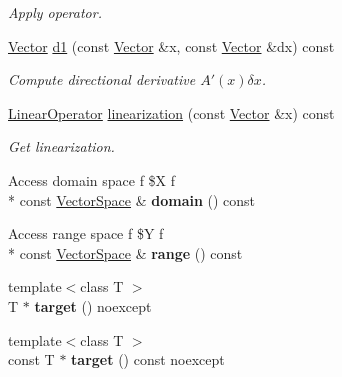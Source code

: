 \begin{DoxyCompactItemize}
\begin{DoxyCompactList}\small\item\em Apply operator. \end{DoxyCompactList}\item 
\hypertarget{classSpacy_1_1C1Operator_a1b6a06c88bc4168c750ee4ffdc81f1dd}{\hyperlink{classSpacy_1_1Vector}{Vector} \hyperlink{classSpacy_1_1C1Operator_a1b6a06c88bc4168c750ee4ffdc81f1dd}{d1} (const \hyperlink{classSpacy_1_1Vector}{Vector} \&x, const \hyperlink{classSpacy_1_1Vector}{Vector} \&dx) const }\label{classSpacy_1_1C1Operator_a1b6a06c88bc4168c750ee4ffdc81f1dd}

\begin{DoxyCompactList}\small\item\em Compute directional derivative $A'(x)\delta x$. \end{DoxyCompactList}\item 
\hypertarget{classSpacy_1_1C1Operator_a71aabe09ec29a8a1bb197eef035d6672}{\hyperlink{classSpacy_1_1LinearOperator}{Linear\-Operator} \hyperlink{classSpacy_1_1C1Operator_a71aabe09ec29a8a1bb197eef035d6672}{linearization} (const \hyperlink{classSpacy_1_1Vector}{Vector} \&x) const }\label{classSpacy_1_1C1Operator_a71aabe09ec29a8a1bb197eef035d6672}

\begin{DoxyCompactList}\small\item\em Get linearization. \end{DoxyCompactList}\item 
\hypertarget{classSpacy_1_1C1Operator_a0ce49bb91eee9fa9cc5d63599ab9b23c}{Access domain space f \$X f \\*
const \hyperlink{classSpacy_1_1VectorSpace}{Vector\-Space} \& {\bfseries domain} () const }\label{classSpacy_1_1C1Operator_a0ce49bb91eee9fa9cc5d63599ab9b23c}

\item 
\hypertarget{classSpacy_1_1C1Operator_a1331de78c1c489b846507c3f7461dc15}{Access range space f \$Y f \\*
const \hyperlink{classSpacy_1_1VectorSpace}{Vector\-Space} \& {\bfseries range} () const }\label{classSpacy_1_1C1Operator_a1331de78c1c489b846507c3f7461dc15}

\item 
\hypertarget{classSpacy_1_1C1Operator_a7c515af344029cf8e60e89d45bf8fade}{{\footnotesize template$<$class T $>$ }\\T $\ast$ {\bfseries target} () noexcept}\label{classSpacy_1_1C1Operator_a7c515af344029cf8e60e89d45bf8fade}

\item 
\hypertarget{classSpacy_1_1C1Operator_ab8a5618949b1b861e3085aa085922884}{{\footnotesize template$<$class T $>$ }\\const T $\ast$ {\bfseries target} () const noexcept}\label{classSpacy_1_1C1Operator_ab8a5618949b1b861e3085aa085922884}

\end{DoxyCompactItemize}


